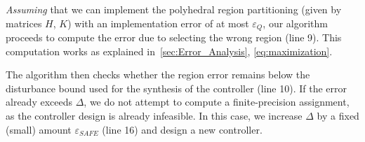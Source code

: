 \emph{Assuming} that we can implement the polyhedral region partitioning (given by
matrices $H$, $K$) with an implementation error of at most $\varepsilon_Q$,
our algorithm proceeds to compute the error due to selecting the wrong region (line 9).
This computation works as explained in~\autoref{sec:Error_Analysis}, \autoref{eq:maximization}.



The algorithm then checks whether the region error remains below the disturbance
bound used for the synthesis of the controller (line 10). 
If the error already exceeds $\Delta$, we do not attempt to compute a finite-precision
assignment, as the controller design is already infeasible.
In this case, we increase $\Delta$ by a fixed (small) amount $\varepsilon_{SAFE}$ (line 16) and 
design a new controller. 


